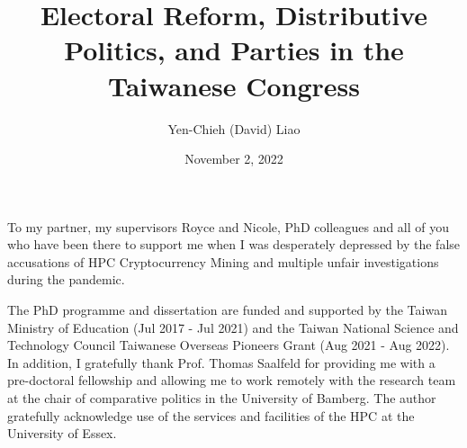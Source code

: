 \documentclass[12pt,leqno]{report}
\begin{document}
\sloppy
\title{Electoral Reform, Distributive Politics, 
            and Parties in the Taiwanese Congress} 
\author{Yen-Chieh (David) Liao}

\date{November 2, 2022}

\maketitle

\thispagestyle{plain}
\newenvironment{dedication}
{\cleardoublepage {}
  \begin{center} \em}
  {\end{center} \vspace*{\stretch{3}} }
\begin{dedication}

To my partner, my supervisors Royce and Nicole, PhD colleagues and all of you who have been there to support me when I was desperately depressed by the false accusations of HPC Cryptocurrency Mining and multiple unfair investigations during the pandemic.

\end{dedication}

\begin{acknowledgments}
The PhD programme and dissertation are funded and supported by the Taiwan Ministry of Education (Jul 2017 - Jul 2021) and the Taiwan National Science and Technology Council Taiwanese Overseas Pioneers Grant (Aug 2021 - Aug 2022). In addition, I gratefully thank Prof. Thomas Saalfeld for providing me with a pre-doctoral fellowship and allowing me to work remotely with the research team at the chair of comparative politics in the University of Bamberg. The author gratefully acknowledge use of the services and facilities of the HPC at the University of Essex.


\end{acknowledgments}

\tableofcontents

\listoftables

\listoffigures

\begin{abstract}

\end{abstract}
\end{document}
